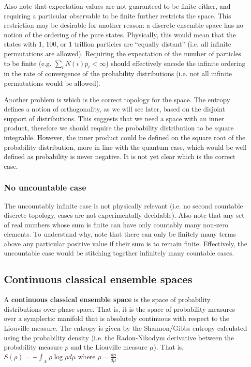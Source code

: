 Also note that expectation values are not guaranteed to be finite either, and requiring a particular observable to be finite further restricts the space. This restriction may be desirable for another reason: a discrete ensemble space has no notion of the ordering of the pure states. Physically, this would mean that the states with 1, 100, or 1 trillion particles are ``equally distant'' (i.e. all infinite permutations are allowed). Requiring the expectation of the number of particles to be finite (e.g. $\sum_i N(i) p_i < \infty$) should effectively encode the infinite ordering in the rate of convergence of the probability distributions (i.e. not all infinite permutations would be allowed).

Another problem is which is the correct topology for the space. The entropy defines a notion of orthogonality, as we will see later, based on the disjoint support of distributions. This suggests that we need a space with an inner product, therefore we should require the probability distribution to be square integrable. However, the inner product could be defined on the square root of the probability distribution, more in line with the quantum case, which would be well defined as probability is never negative. It is not yet clear which is the correct case.

\subsubsection{No uncountable case}

The uncountably infinite case is not physically relevant (i.e. no second countable discrete topology, cases are not experimentally decidable). Also note that any set of real numbers whose sum is finite can have only countably many non-zero elements. To understand why, note that there can only be finitely many terms above any particular positive value if their sum is to remain finite. Effectively, the uncountable case would be stitching together infinitely many countable cases.

\subsection{Continuous classical ensemble spaces}

\begin{defn}
	A \textbf{continuous classical ensemble space} is the space of probability distributions over phase space. That is, it is the space of probability measures over a symplectic manifold that is absolutely continuous with respect to the Liouville measure. The entropy is given by the Shannon/Gibbs entropy calculated using the probability density (i.e. the Radon-Nikodym derivative between the probability measure $p$ and the Liouville measure $\mu$). That is, $S(\rho) = - \int_X \rho \log \rho d\mu$ where $\rho = \frac{dp}{d\mu}$.
\end{defn}

